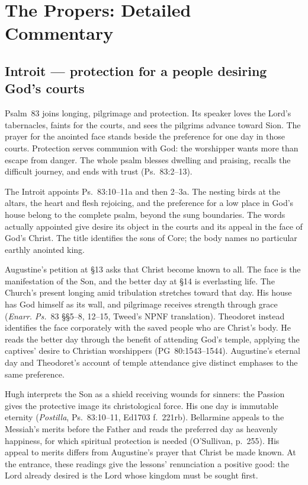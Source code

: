 \ifdefined\TriptychPrintEdition
\else
\section*{The Propers: Detailed Commentary}\label{per-element-sweep}
\fi
\sectionguard
\subsection*{Introit --- protection for a people desiring God's courts\enspace{}}\label{introit-treatment}

Psalm~83 joins longing, pilgrimage and protection. Its speaker loves the
Lord's tabernacles, faints for the courts, and sees the pilgrims advance toward
Sion. The prayer for the anointed face stands beside the preference for one
day in those courts. Protection serves communion with God: the worshipper
wants more than escape from danger. The whole psalm blesses dwelling and
praising, recalls the difficult journey, and ends with trust
(Ps.~83:2--13).

The Introit appoints Ps.~83:10--11a and then 2--3a. The nesting birds at the
altars, the heart and flesh rejoicing, and the preference for a low place in
God's house belong to the complete psalm, beyond the sung boundaries. The
words actually appointed give desire its object in the courts and its appeal
in the face of God's Christ. The title identifies the sons of Core; the body
names no particular earthly anointed king.

Augustine's petition at §13 asks that Christ become known to all. The face is
the manifestation of the Son, and the better day at §14 is everlasting life.
The Church's present longing amid tribulation stretches toward that day. His
house has God himself as its wall, and pilgrimage receives strength through
grace (\emph{Enarr. Ps.}~83 §§5--8, 12--15, Tweed's NPNF translation).
Theodoret instead identifies the face corporately with the saved people who
are Christ's body. He reads the better day through the benefit of attending
God's temple, applying the captives' desire to Christian worshippers
(PG~80:1543--1544). Augustine's eternal day and Theodoret's account of temple
attendance give distinct emphases to the same preference.

Hugh interprets the Son as a shield receiving wounds for sinners: the
Passion gives the protective image its christological force. His one day is
immutable eternity (\emph{Postilla}, Ps.~83:10--11, Ed1703 f.~221rb).
Bellarmine appeals to the Messiah's merits before the Father and reads the
preferred day as heavenly happiness, for which spiritual protection is
needed (O'Sullivan, p.~255). His appeal to merits differs from Augustine's
prayer that Christ be made known. At the entrance, these readings give the
lessons' renunciation a positive good: the Lord already desired is the Lord
whose kingdom must be sought first.

